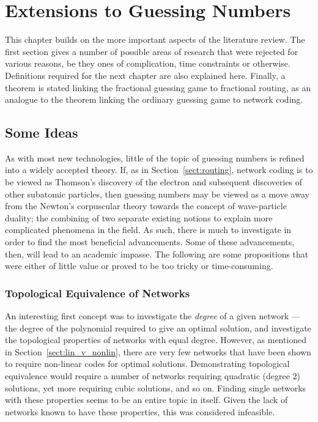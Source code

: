 
\chapter{Extensions to Guessing Numbers}
\label{ch:prob}

This chapter builds on the more important aspects of the literature review. The first section gives a number of possible areas of research that were rejected for various reasons, be they ones of complication, time constraints or otherwise. Definitions required for the next chapter are also explained here. Finally, a theorem is stated linking the fractional guessing game to fractional routing, as an analogue to the theorem linking the ordinary guessing game to network coding.

\section{Some Ideas}
\label{sect:ideas}

As with most new technologies, little of the topic of guessing numbers is refined into a widely accepted theory. If, as in Section~\ref{sect:routing}, network coding is to be viewed as Thomson's discovery of the electron and subsequent discoveries of other subatomic particles, then guessing numbers may be viewed as a move away from the Newton's corpuscular theory towards the concept of wave-particle duality; the combining of two separate existing notions to explain more complicated phenomena in the field. As such, there is much to investigate in order to find the most beneficial advancements. Some of these advancements, then, will lead to an academic impasse. The following are some propositions that were either of little value or proved to be too tricky or time-consuming.

\subsection{Topological Equivalence of Networks}

An interesting first concept was to investigate the \emph{degree} of a given network --- the degree of the polynomial required to give an optimal solution, and investigate the topological properties of networks with equal degree. However, as mentioned in Section~\ref{sect:lin_v_nonlin}, there are very few networks that have been shown to require non-linear codes for optimal solutions. Demonstrating topological equivalence would require a number of networks requiring quadratic (degree $2$) solutions, yet more requiring cubic solutions, and so on. Finding single networks with these properties seems to be an entire topic in itself. Given the lack of networks known to have these properties, this was considered infeasible.


